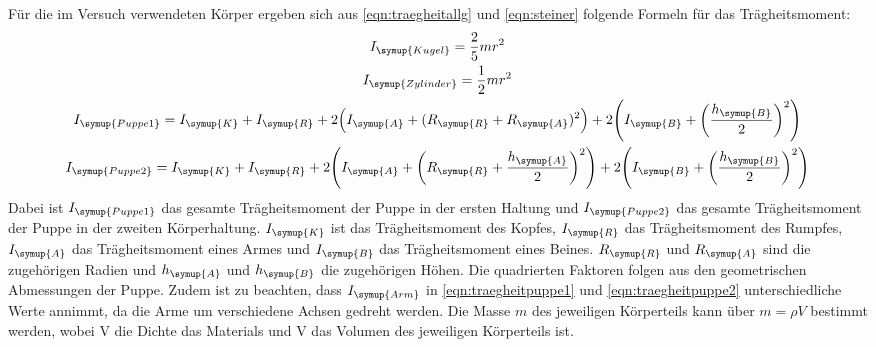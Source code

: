 Für die im Versuch verwendeten Körper ergeben sich aus \eqref{eqn:traegheitallg}
und \eqref{eqn:steiner} folgende Formeln für das Trägheitsmoment:
\begin{gather}
  I_{\symup{Kugel}}=\frac{2}{5}mr^2
  \label{eqn:traegheitkugel} \\
  I_{\symup{Zylinder}}=\frac{1}{2}mr^2
  \label{eqn:traegheitzylinder} \\
  \begin{split}
    I_{\symup{Puppe1}}=I_{\symup{K}}+I_{\symup{R}}
    +2\Bigl(I_{\symup{A}}+(R_{\symup{R}}+R_{\symup{A}})^2\Bigr)
    +2\Biggl(I_{\symup{B}}+\biggl(\frac{h_{\symup{B}}}{2}\biggr)^2\Biggr)
    \label{eqn:traegheitpuppe1}
  \end{split}
  \\
  \begin{split}
    I_{\symup{Puppe2}}=I_{\symup{K}}+I_{\symup{R}}
    +2\Biggl(I_{\symup{A}}+\biggl(R_{\symup{R}}+\frac{h_{\symup{A}}}{2}\biggr)^2\Biggr)
    +2\Biggl(I_{\symup{B}}+\biggl(\frac{h_{\symup{B}}}{2}\biggr)^2\Biggr)
    \label{eqn:traegheitpuppe2}
  \end{split}
\end{gather}
Dabei ist $I_{\symup{Puppe1}}$ das gesamte Trägheitsmoment der Puppe in der ersten
Haltung und $I_{\symup{Puppe2}}$ das gesamte Trägheitsmoment der Puppe in der
zweiten Körperhaltung. $I_{\symup{K}}$ ist das Trägheitsmoment des Kopfes, $I_{\symup{R}}$
das Trägheitsmoment des Rumpfes, $I_{\symup{A}}$ das Trägheitsmoment eines Armes und
$I_{\symup{B}}$ das Trägheitsmoment eines Beines. $R_{\symup{R}}$ und $R_{\symup{A}}$ sind die zugehörigen
Radien und $h_{\symup{A}}$ und $h_{\symup{B}}$ die zugehörigen Höhen. Die quadrierten Faktoren folgen
aus den geometrischen Abmessungen der Puppe. Zudem ist zu beachten, dass $I_{\symup{Arm}}$
in \eqref{eqn:traegheitpuppe1} und \eqref{eqn:traegheitpuppe2} unterschiedliche Werte
annimmt, da die Arme um verschiedene Achsen gedreht werden. Die Masse $m$ des jeweiligen
Körperteils kann über $m=\rho V$ bestimmt werden, wobei V die Dichte das Materials und
V das Volumen des jeweiligen Körperteils ist. 
